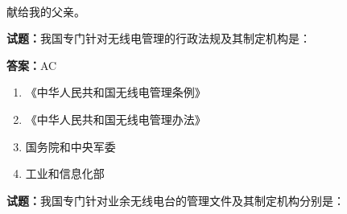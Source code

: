 \documentclass{ctexbook}
\newcommand{\reponame}{mike2718/ham}    %
\newcommand{\commiturl}{\url{https://github.com/\reponame/commit/\commithash}}
\begin{document}

\title{}
\author{\large \texttt{BG7XTQ}编著}
\date{\large{日期：\texttt{\today}}
  \vspace{15em}
  \\使用 
  \\编译自提交 \texttt{\commiturl}
}

\maketitle %

\thispagestyle{empty}
\vfil
\ \\
\vspace{15em}
\begin{center}
  {\Large 献给我的父亲。}
\end{center}

\newpage
\tableofcontents









\vspace{1em}

\textbf{试题：}我国专门针对无线电管理的行政法规及其制定机构是： 

\textbf{答案：}AC 

\begin{enumerate}[leftmargin=3em]
  \item 《中华人民共和国无线电管理条例》 

  \item 《中华人民共和国无线电管理办法》 

  \item 国务院和中央军委 

  \item 工业和信息化部 

\end{enumerate}





\vspace{1em}

\textbf{试题：}我国专门针对业余无线电台的管理文件及其制定机构分别是： 
\end{document}

